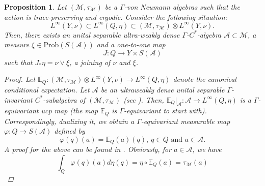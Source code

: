 \documentclass[12pt]{amsart}
\newtheorem{proposition}[thm]{Proposition}
\theoremstyle{definition}
\begin{document}
\begin{proposition}
\label{prop:GSMaster}Let $(\mathcal{M},\tau_{\mathcal{M}})$ 
  be a $\Gamma$-von Neumann algebras such that the action is trace-preserving and ergodic.  Consider the following situation:   
$$L^{\infty}(Y,\nu)\subset L^{\infty}(Q,\eta)\subset(\mathcal{M},\tau_{\mathcal{M}})\otimes L^{\infty}(Y,\nu).$$
Then, there exists an unital separable ultra-weakly dense $\Gamma$-$C^*$-algebra $\mathcal{A}\subset\mathcal{M}$, a measure $\xi\in \text{Prob}(S(\mathcal{A}))$ and a one-to-one map $$J: Q\to Y\times S(\mathcal{A})$$ such that $J_*\eta=\nu\vee\xi$, a joining of $\nu$ and $\xi$.
\begin{proof}
Let $\mathbb{E}_Q:(\mathcal{M},\tau_{\mathcal{M}})\otimes L^{\infty}(Y,\nu)\to L^{\infty}(Q,\eta)$ denote the canonical conditional expectation. Let $\mathcal{A}$ be an ultraweakly dense unital separable $\Gamma$-invariant $C^*$-subalgebra of $(\mathcal{M},\tau_{\mathcal{M}})$ (see \cite[proposition~2.1]{amrutam2024subalgebras}). Then, $\mathbb{E}_Q|_{\mathcal{A}}:\mathcal{A}\to L^{\infty}(Q,\eta)$ is a $\Gamma$-equivariant ucp map (the map $\mathbb{E}_{Q}$ is $\Gamma$-equivariant to start with). Correspondingly, dualizing it, we obtain a $\Gamma$-equivariant measurable map $\varphi: Q\to S(\mathcal{A})$  defined by
$$\varphi(q)(a)=\mathbb{E}_{Q}(a)(q), ~q\in Q\text{ and } a\in\mathcal{A}.$$
A proof for the above can be found in \cite{bassi2020separable}.
Obviously, for $a\in\mathcal{A}$, we have
$$\int_Q\varphi(q)(a)d\eta(q)=\eta\circ\mathbb{E}_Q(a)=\tau_{\mathcal{M}}(a)$$


\end{proof}
\end{proposition}
\end{document}
